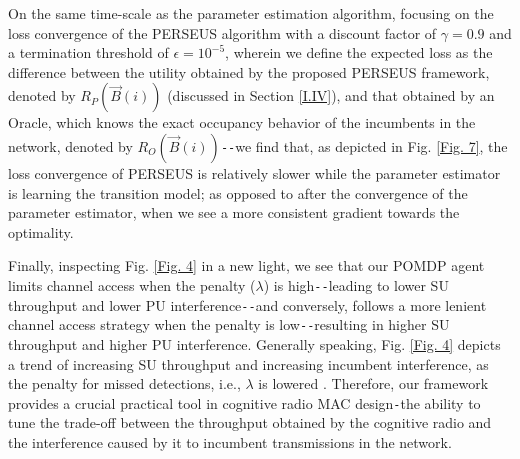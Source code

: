 On the same time-scale as the parameter estimation algorithm, focusing on the loss convergence of the PERSEUS algorithm with a discount factor of $\gamma{=}0.9$ and a termination threshold of $\epsilon{=}10^{-5}$, wherein we define the expected loss as the difference between the utility obtained by the proposed PERSEUS framework, denoted by $R_{P}(\vec{B}(i))$ (discussed in Section \ref{I.IV}), and that obtained by an Oracle, which knows the exact occupancy behavior of the incumbents in the network, denoted by $R_{O}(\vec{B}(i))$\texttt{-{}-}we find that, as depicted in Fig. \ref{Fig. 7}, the loss convergence of PERSEUS is relatively slower while the parameter estimator is learning the transition model; as opposed to after the convergence of the parameter estimator, when we see a more consistent gradient towards the optimality.

Finally, inspecting Fig. \ref{Fig. 4} in a new light, we see that our POMDP agent limits channel access when the penalty ($\lambda$) is high\texttt{-{}-}leading to lower SU throughput and lower PU interference\texttt{-{}-}and conversely, follows a more lenient channel access strategy when the penalty is low\texttt{-{}-}resulting in higher SU throughput and higher PU interference. Generally speaking, Fig. \ref{Fig. 4} depicts a trend of increasing SU throughput and increasing incumbent interference, as the penalty for missed detections, i.e., $\lambda$ is lowered \cite{WCL:paper}. Therefore, our framework provides a crucial practical tool in cognitive radio MAC design\texttt{-}the ability to tune the trade-off between the throughput obtained by the cognitive radio and the interference caused by it to incumbent transmissions in the network.
